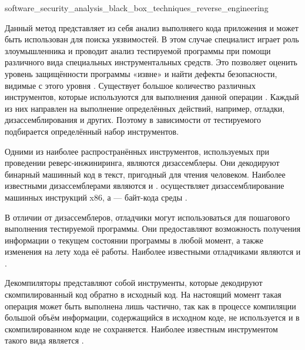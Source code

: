 
	{software_security_analysis_black_box_techniques_reverse_engineering}

%
Данный метод представляет из себя анализ выполняего кода приложения и может быть использован 
для поиска уязвимостей. 
%
В этом случае специалист играет роль злоумышленника и проводит анализ тестируемой программы 
при помощи различного вида специальных инструментальных средств. 
%
Это позволяет оценить уровень защищённости программы «извне» и найти дефекты безопасности, видимые 
с этого уровня . 
%
Существует большое количество различных инструментов, которые используются для выполнения данной 
операции . 
%
Каждый из них направлен на выполнение определённых действий, например, отладки, дизассемблирования 
и других. 
%
Поэтому в зависимости от тестируемого  подбирается определённый набор 
инструментов.

%
Одними из наиболее распространённых инструментов, используемых при проведении реверс-инжиниринга, 
являются дизассемблеры. 
%
Они декодируют бинарный машинный код в текст, пригодный для чтения человеком. 
%
Наиболее известными дизассемблерами являются   и  
. 
%
 осуществляет дизассемблирование машинных инструкций x86, а  — 
байт-кода среды  .

%
В отличии от дизассемблеров, отладчики могут использоваться для пошагового выполнения тестируемой 
программы. 
%
Они предоставляют возможность получения информации о текущем состоянии программы в любой момент, 
а также изменения на лету хода её работы. Наиболее известными отладчиками являются 
  и  .

%
Декомпиляторы представляют собой инструменты, которые декодируют скомпилированный код обратно 
в исходный код. 
%
На настоящий момент такая операция может быть выполнена лишь частично, так как в процессе 
компиляции большой объём информации, содержащийся в исходном коде, не используется и 
в скомпилированном коде не сохраняется. 
%
Наиболее известным инструментом такого вида является  
.

